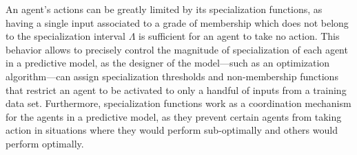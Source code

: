 \documentclass{ieeeaccess}
\begin{document}
An agent's actions can be greatly limited by its specialization functions, as having a single input associated to a grade of membership which does not belong to the specialization interval $\Lambda$ is sufficient for an agent to take no action. This behavior allows to precisely control the magnitude of specialization of each agent in a predictive model, as the designer of the model---such as an optimization algorithm---can assign specialization thresholds and non-membership functions that restrict an agent to be activated to only a handful of inputs from a training data set. Furthermore, specialization functions work as a coordination mechanism for the agents in a predictive model, as they prevent certain agents from taking action in situations where they would perform sub-optimally and others would perform optimally.


\end{document}
